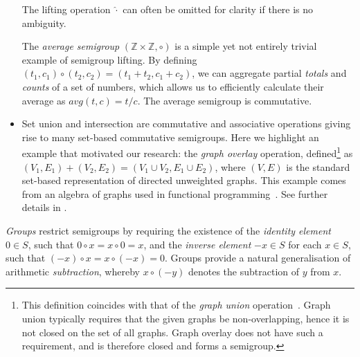 \documentclass{toc}
\begin{document}
\begin{itemize}
    The lifting operation $\hat{\cdot}$ can often be omitted for clarity if there
    is no ambiguity.

    The \emph{average semigroup} $(\mathbb{Z} \times \mathbb{Z}, \circ)$ is a
    simple yet not entirely trivial example of semigroup lifting. By defining
    $(t_1, c_1) \circ (t_2, c_2) = (t_1 + t_2, c_1 + c_2)$, we can aggregate
    partial \emph{totals} and \emph{counts} of a set of numbers, which allows us
    to efficiently calculate their average as $\textit{avg}(t, c) = t/c$.
    The average semigroup is commutative.

    \item Set union and intersection are commutative and associative operations
    giving rise to many set-based commutative semigroups. Here we highlight an
    example that motivated our research: the \emph{graph overlay} operation,
    defined\footnote{This definition coincides with that of the
        \emph{graph union} operation~\cite{1969_graph_theory_harary}. Graph union
        typically requires that
the  %
given graphs %
be  %
non-overlapping, hence it is not
        closed on the set of all graphs. Graph overlay does not have such a
        requirement, and is therefore closed and forms a semigroup.} as
    $(V_1, E_1) + (V_2, E_2) = (V_1 \cup V_2, E_1 \cup E_2)$,
    where  %
    $(V, E)$ is %
    the  %
    standard set-based representation %
    of  %
    directed unweighted
    graphs.  This example comes   %
    from an algebra of graphs used in functional programming~\cite{mokhov2017algebraic}.
    See further details in .
\end{itemize}

\emph{Groups} %
restrict  %
semigroups by requiring the existence of the \emph{identity
    element} $0 \in S$, such that $0 \circ x = x \circ 0=x$, and the \emph{inverse
  element} $-x \in S$ for %
  each  %
$x \in S$, such that
$(-x) \circ x = x \circ (-x) = 0$. Groups provide a natural generalisation of
arithmetic \emph{subtraction}, whereby $x \circ (-y)$ denotes the subtraction of
$y$ from $x$.
\end{document}
